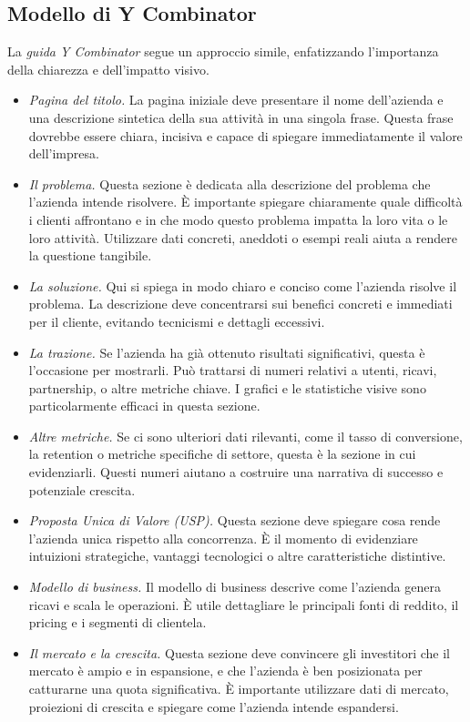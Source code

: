 \subsection{Modello di Y Combinator}
La \textit{guida Y Combinator} segue un approccio simile, enfatizzando l’importanza della chiarezza e dell’impatto visivo.
\begin{itemize}
    \item \textit{Pagina del titolo.} La pagina iniziale deve presentare il nome dell’azienda e una descrizione sintetica della sua attività in una singola frase. Questa frase dovrebbe essere chiara, incisiva e capace di spiegare immediatamente il valore dell’impresa.
    \item \textit{Il problema.} Questa sezione è dedicata alla descrizione del problema che l’azienda intende risolvere. È importante spiegare chiaramente quale difficoltà i clienti affrontano e in che modo questo problema impatta la loro vita o le loro attività. Utilizzare dati concreti, aneddoti o esempi reali aiuta a rendere la questione tangibile.
    \item \textit{La soluzione.} Qui si spiega in modo chiaro e conciso come l’azienda risolve il problema. La descrizione deve concentrarsi sui benefici concreti e immediati per il cliente, evitando tecnicismi e dettagli eccessivi.
    \item \textit{La trazione.} Se l’azienda ha già ottenuto risultati significativi, questa è l’occasione per mostrarli. Può trattarsi di numeri relativi a utenti, ricavi, partnership, o altre metriche chiave. I grafici e le statistiche visive sono particolarmente efficaci in questa sezione.
    \item \textit{Altre metriche.} Se ci sono ulteriori dati rilevanti, come il tasso di conversione, la retention o metriche specifiche di settore, questa è la sezione in cui evidenziarli. Questi numeri aiutano a costruire una narrativa di successo e potenziale crescita.
    \item \textit{Proposta Unica di Valore (USP).} Questa sezione deve spiegare cosa rende l’azienda unica rispetto alla concorrenza. È il momento di evidenziare intuizioni strategiche, vantaggi tecnologici o altre caratteristiche distintive.
    \item \textit{Modello di business.} Il modello di business descrive come l’azienda genera ricavi e scala le operazioni. È utile dettagliare le principali fonti di reddito, il pricing e i segmenti di clientela.
    \item \textit{Il mercato e la crescita.} Questa sezione deve convincere gli investitori che il mercato è ampio e in espansione, e che l’azienda è ben posizionata per catturarne una quota significativa. È importante utilizzare dati di mercato, proiezioni di crescita e spiegare come l’azienda intende espandersi.

\end{itemize}
